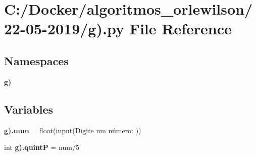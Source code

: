 \section{C\+:/\+Docker/algoritmos\+\_\+orlewilson/22-\/05-\/2019/g).py File Reference}
\label{g_08_8py}
\subsection*{Namespaces}
\begin{DoxyCompactItemize}
\item 
 \textbf{ g)}
\end{DoxyCompactItemize}
\subsection*{Variables}
\begin{DoxyCompactItemize}
\item 
\textbf{ g).\+num} = float(input(\textquotesingle{}Digite um número\+: \textquotesingle{}))
\item 
int \textbf{ g).\+quintP} = num/5
\end{DoxyCompactItemize}
